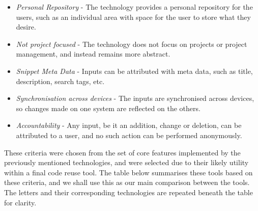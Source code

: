 \begin{itemize}
\item \textit{Personal Repository} - The technology provides a personal repository for the users, such as an individual area with space for the user to store what they desire.
\item \textit{Not project focused} - The technology does not focus on projects or project management, and instead remains more abstract.
\item \textit{Snippet Meta Data} - Inputs can be attributed with meta data, such as title, description, search tags, etc.
\item \textit{Synchronisation across devices} - The inputs are synchronised across devices, so changes made on one system are reflected on the others.
\item \textit{Accountability} - Any input, be it an addition, change or deletion, can be attributed to a user, and no such action can be performed anonymously.
\end{itemize}

These criteria were chosen from the set of core features implemented by the previously mentioned technologies, and were selected due to their likely utility within a final code reuse tool. The table below summarises these tools based on these criteria, and we shall use this as our main comparison between the tools. The letters and their corresponding technologies are repeated beneath the table for clarity.


